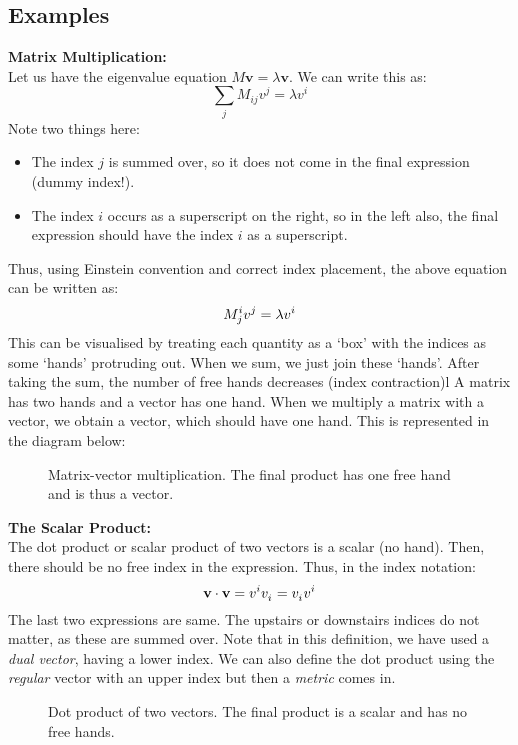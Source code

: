  \subsection{Examples}
 \textbf{Matrix Multiplication:}\\[0.3cm]
 Let us have the eigenvalue equation $M\mathbf{v} = \lambda\mathbf{v}$. We can write this as: 
 $$\sum\limits_j M_{ij}v^j = \lambda v^i$$
 Note two things here: 
 \begin{itemize}
    \item The index $j$ is summed over, so it does not come in the final expression (dummy index!).
    \item The index $i$ occurs as a superscript on the right, so in the left also, the final expression should have the index $i$ as a superscript.
 \end{itemize}
 Thus, using Einstein convention and correct index placement, the above equation can be written as:
$$M\indices*{^i_j}v\indices{^j} = \lambda v\indices{^i}$$
This can be visualised by treating each quantity as a `box' with the indices as some `hands' protruding out. When we sum, we just join these `hands'. After taking the sum, the number of free hands decreases (index contraction)l A matrix has two hands and a vector has one hand. When we multiply a matrix with a vector, we obtain a vector, which should have one hand. This is represented in the diagram below:
\begin{figure}[H]
    \centering
    
    \caption{Matrix-vector multiplication. The final product has one free hand and is thus a vector.}
\end{figure}
\noindent
\textbf{The Scalar Product:}\\[0.3cm]
The dot product or scalar product of two vectors is a scalar (no hand). Then, there should be no free index in the expression. Thus, in the index notation:
$$\mathbf{v}\cdot \mathbf{v} = v\indices{^i}v\indices{_i} =v\indices{_i}v\indices{^i}  $$
The last two expressions are same. The upstairs or downstairs indices do not matter, as these are summed over. Note that in this definition, we have used a \textit{dual vector}, having a lower index. We can also define the dot product using the \textit{regular} vector with an upper index but then a \textit{metric} comes in.
\begin{figure}[H]
    \centering
    
    \caption{Dot product of two vectors. The final product is a scalar and has no free hands.}
\end{figure}
